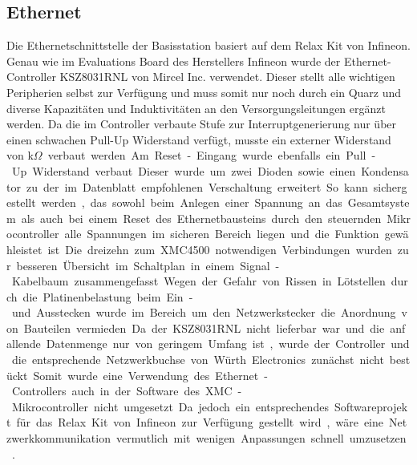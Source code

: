 \subsection{Ethernet}
Die Ethernetschnittstelle der Basisstation basiert auf dem  Relax Kit von Infineon. Genau wie im Evaluations Board des Herstellers Infineon wurde der Ethernet-Controller KSZ8031RNL von Mircel Inc. verwendet. Dieser stellt alle wichtigen Peripherien selbst zur Verfügung und muss somit nur noch durch ein Quarz und diverse Kapazitäten und Induktivitäten an den Versorgungsleitungen ergänzt werden. Da die im Controller verbaute Stufe zur Interruptgenerierung nur über einen schwachen Pull-Up Widerstand verfügt, musste ein externer Widerstand von \unit[1]{k$\Omega$} verbaut werden. Am Reset-Eingang wurde ebenfalls ein Pull-Up Widerstand verbaut. Dieser wurde um zwei Dioden sowie einen Kondensator zu der im Datenblatt empfohlenen Verschaltung erweitert. So kann sichergestellt werden, das sowohl beim Anlegen einer Spannung an das Gesamtsystem als auch bei einem Reset des Ethernetbausteins durch den steuernden Mikrocontroller alle Spannungen im sicheren Bereich liegen und die Funktion gewähleistet ist. Die dreizehn zum XMC4500 notwendigen Verbindungen wurden zur besseren Übersicht im Schaltplan in einem Signal-Kabelbaum zusammengefasst. Wegen der Gefahr von Rissen in Lötstellen durch die Platinenbelastung beim Ein- und Ausstecken wurde im Bereich um den Netzwerkstecker die Anordnung von Bauteilen vermieden. 
Da der KSZ8031RNL  nicht lieferbar war und die anfallende Datenmenge nur von geringem Umfang ist, wurde der Controller und die entsprechende Netzwerkbuchse von Würth Electronics zunächst nicht bestückt. Somit wurde eine Verwendung des Ethernet-Controllers auch in der Software des XMC-Mikrocontroller nicht umgesetzt. Da jedoch ein entsprechendes Softwareprojekt für das Relax Kit von Infineon zur Verfügung gestellt  wird, wäre eine Netzwerkkommunikation vermutlich mit wenigen Anpassungen schnell umzusetzen \cite{DAVE-3-Example-}. 








